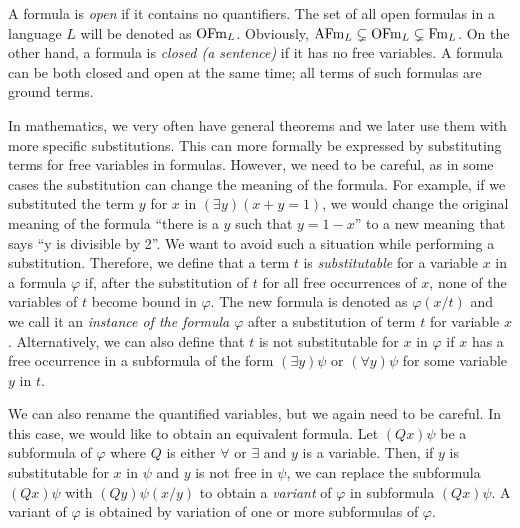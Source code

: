 A formula is \emph{open} if it contains no quantifiers. The set of all open formulas in a language $L$ will be denoted as $\operatorname{OFm}_L$. Obviously, $\operatorname{AFm}_L \subsetneq \operatorname{OFm}_L \subsetneq \operatorname{Fm}_L$. On the other hand, a formula is \emph{closed (a sentence)} if it has no free variables. A formula can be both closed and open at the same time; all terms of such formulas are ground terms.

In mathematics, we very often have general theorems and we later use them with more specific substitutions. This can more formally be expressed by substituting terms for free variables in formulas. However, we need to be careful, as in some cases the substitution can change the meaning of the formula. For example, if we substituted the term $y$ for $x$ in $(\exists y) (x+y=1)$, we would change the original meaning of the formula ``there is a $y$ such that $y = 1-x$'' to a new meaning that says ``y is divisible by 2''. We want to avoid such a situation while performing a substitution. Therefore, we define that a term $t$ is \emph{substitutable} for a variable $x$ in a formula $\varphi$ if, after the substitution of $t$ for all free occurrences of $x$, none of the variables of $t$ become bound in $\varphi$. The new formula is denoted as $\varphi(x/t)$ and we call it an \emph{instance of the formula $\varphi$} after a substitution of term $t$ for variable $x$. Alternatively, we can also define that $t$ is not substitutable for $x$ in $\varphi$ if $x$ has a free occurrence in a subformula of the form $(\exists y)\psi$ or $(\forall y) \psi$ for some variable $y$ in $t$.

We can also rename the quantified variables, but we again need to be careful. In this case, we would like to obtain an equivalent formula. Let $(Qx)\psi$ be a subformula of $\varphi$ where $Q$ is either $\forall$ or $\exists$ and $y$ is a variable. Then, if $y$ is substitutable for $x$ in $\psi$ and $y$ is not free in $\psi$, we can replace the subformula $(Qx)\psi$ with $(Qy)\psi(x/y)$ to obtain a \emph{variant} of $\varphi$ in subformula $(Qx)\psi$. A variant of $\varphi$ is obtained by variation of one or more subformulas of $\varphi$.


